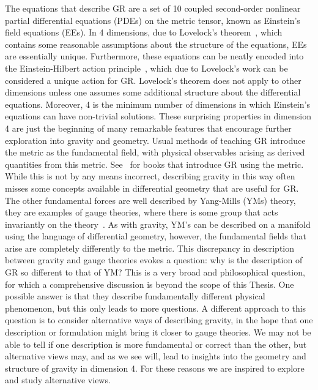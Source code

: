 \documentclass[10pt]{report}
\theoremstyle{definition}
\begin{document}
The equations that describe GR are a set of 10 coupled second-order nonlinear partial differential equations (PDEs) on the metric tensor, known as Einstein's field equations (EEs). In 4 dimensions, due to Lovelock's theorem~\cite{The_Four_Dimens_Lovelo_1972}, which contains some reasonable assumptions about the structure of the equations, EEs are essentially unique. Furthermore, these equations can be neatly encoded into the Einstein-Hilbert action principle~\cite{Hilbert1915}, which due to Lovelock's work can be considered a unique action for GR. Lovelock's theorem does not apply to other dimensions unless one assumes some additional structure about the differential equations. Moreover, 4 is the minimum number of dimensions in which Einstein's equations can have non-trivial solutions. These surprising properties in dimension 4 are just the beginning of many remarkable features that encourage further exploration into gravity and geometry. Usual methods of teaching GR introduce the metric as the fundamental field, with physical observables arising as derived quantities from this metric. See~\cite{Carroll_2019,Geometry_Topol_Nakaha_2018} for books that introduce GR using the metric. While this is not by any means incorrect, describing gravity in this way often misses some concepts available in differential geometry that are useful for GR. The other fundamental forces are well described by Yang-Mills (YMs) theory, they are examples of gauge theories, where there is some group that acts invariantly on the theory~\cite{Geometry_Topol_Nakaha_2018}. As with gravity, YM's can be described on a manifold using the language of differential geometry, however, the fundamental fields that arise are completely differently to the metric. This discrepancy in description between gravity and gauge theories evokes a question: why is the description of GR so different to that of YM? This is a very broad and philosophical question, for which a comprehensive discussion is beyond the scope of this Thesis. One possible answer is that they describe fundamentally different physical phenomenon, but this only leads to more questions. A different approach to this question is to consider alternative ways of describing gravity, in the hope that one description or formulation might bring it closer to gauge theories. We may not be able to tell if one description is more fundamental or correct than the other, but alternative views may, and as we see will, lead to insights into the geometry and structure of gravity in dimension 4. For these reasons we are inspired to explore and study alternative views.
\end{document}
